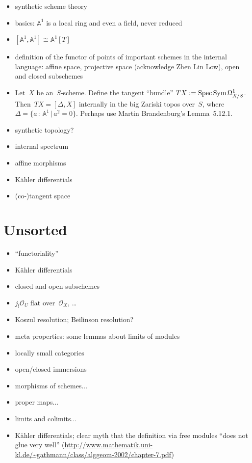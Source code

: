 \documentclass[10pt]{amsart}
\theoremstyle{definition}
\theoremstyle{plain}
\theoremstyle{remark}
\renewcommand{\AA}{\mathbb{A}}
\renewcommand{\O}{\mathcal{O}}
\DeclareMathOperator{\Spec}{Spec}
\newcommand{\?}{\,{:}\,}
\renewcommand{\_}{\mathpunct{.}\,}
\newcommand{\defeq}{\vcentcolon=}
\begin{document}
\begin{itemize}
\item synthetic scheme theory
\item basics: $\AA^1$ is a local ring and even a field, never reduced
\item $[\AA^1,\AA^1] \cong \AA^1[T]$
\item definition of the functor of points of important schemes in the internal
language: affine space, projective space (acknowledge Zhen Lin Low), open and
closed subschemes
\item Let~$X$ be an~$S$-scheme. Define the tangent ``bundle'' $TX \defeq \Spec
\operatorname{Sym} \Omega^1_{X/S}$. Then~$TX = [\Delta,X]$ internally in the big Zariski
topos over~$S$, where~$\Delta = \{ a\?\AA^1 \,|\, a^2 = 0 \}$. Perhaps use Martin
Brandenburg's Lemma~5.12.1.
\item synthetic topology?
\item internal spectrum
\item affine morphisms
\item Kähler differentials
\item (co-)tangent space
\end{itemize}


\section{Unsorted}
\begin{itemize}
\item ``functoriality''
\item Kähler differentials
\item closed and open subschemes
\item $j_! \O_U$ flat over~$\O_X$, \ldots
\item Koszul resolution; Beilinson resolution?
\item meta properties: some lemmas about limits of modules
\item locally small categories
\item open/closed immersions
\item morphisms of schemes...
\item proper maps...
\item limits and colimits...
\item Kähler differentials; clear myth that the definition via free modules
``does not glue very well''
(\url{http://www.mathematik.uni-kl.de/~gathmann/class/alggeom-2002/chapter-7.pdf})
\end{itemize}
\end{document}
